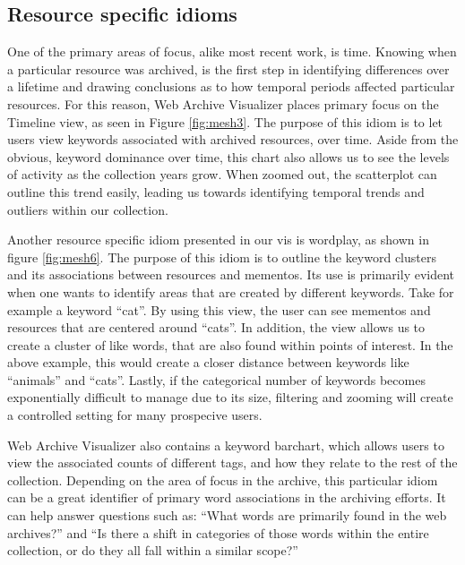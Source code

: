 \documentclass[10pt,journal,compsoc]{IEEEtran}
\begin{document}
\subsection{Resource specific idioms}
One of the primary areas of focus, alike most recent work, is time. Knowing when a particular resource was archived, is the first step in identifying differences over a lifetime and drawing conclusions as to how temporal periods affected particular resources. For this reason, Web Archive Visualizer places primary focus on the Timeline view, as seen in Figure \ref{fig:mesh3}. The purpose of this idiom is to let users view keywords associated with archived resources, over time. Aside from the obvious, keyword dominance over time, this chart also allows us to see the levels of activity as the collection years grow. When zoomed out, the scatterplot can outline this trend easily, leading us towards identifying temporal trends and outliers within our collection. \par

Another resource specific idiom presented in our vis is wordplay, as shown in figure \ref{fig:mesh6}. The purpose of this idiom is to outline the keyword clusters and its associations between resources and mementos. Its use is primarily evident when one wants to identify areas that are created by different keywords. Take for example a keyword ``cat''. By using this view, the user can see mementos and resources that are centered around ``cats''. In addition, the view allows us to create a cluster of like words, that are also found within points of interest. In the above example, this would create a closer distance between keywords like ``animals'' and ``cats''. Lastly, if the categorical number of keywords becomes exponentially difficult to manage due to its size, filtering and zooming will create a controlled setting for many prospecive users. \par

Web Archive Visualizer also contains a keyword barchart, which allows users to view the associated counts of different tags, and how they relate to the rest of the collection. Depending on the area of focus in the archive, this particular idiom can be a great identifier of primary word associations in the archiving efforts. It can help answer questions such as: ``What words are primarily found in the web archives?'' and ``Is there a shift in categories of those words within the entire collection, or do they all fall within a similar scope?'' \par 
\end{document}
